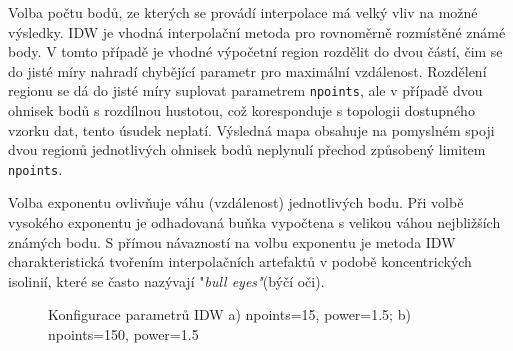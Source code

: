 \documentclass[a4paper,12pt,oneside]{report}
\begin{document}
\begin{description}
\item Volba počtu bodů, ze kterých se provádí interpolace má velký vliv na možné výsledky. IDW je vhodná interpolační metoda pro rovnoměrně rozmístěné známé body. V tomto případě je vhodné výpočetní region rozdělit do dvou částí, čim se  do jisté míry nahradí chybějící parametr pro maximální vzdálenost. Rozdělení regionu se dá do jisté míry suplovat parametrem \texttt{npoints}, ale v případě dvou ohnisek bodů s rozdílnou hustotou, což koresponduje s topologii dostupného vzorku dat, tento úsudek neplatí. Výsledná mapa obsahuje na pomyslném spoji dvou regionů jednotlivých ohnisek bodů neplynulí přechod způsobený limitem \texttt{npoints}.
\item Volba exponentu ovlivňuje váhu (vzdálenost) jednotlivých bodu. Při volbě vysokého exponentu je odhadovaná buňka vypočtena s velikou váhou nejbližších známých bodu. S přímou návazností na volbu exponentu je  metoda IDW charakteristická tvořením interpolačních artefaktů v podobě koncentrických isolinií, které se často nazývají "\textit{bull eyes"}(býčí oči). 
\end{description} 

\begin{figure}[h!]%
    \centering
    \qquad
    \caption[Interpolace IDW]{Konfigurace parametrů IDW a) npoints=15, power=1.5; b) npoints=150, power=1.5\centering}%
    \label{fig:example}%
\end{figure}
\end{document}
